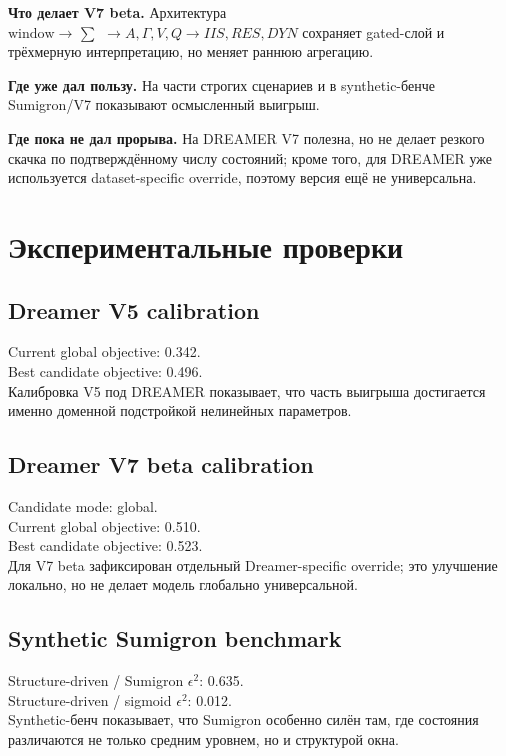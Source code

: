 \documentclass[11pt,a4paper]{article}
\newcommand{\sgop}{\mathop{\sum\!\!\!\int_{\bowtie}}}
\begin{document}
\textbf{Что делает V7 beta.} Архитектура \(\text{window} \to \sgop \to A,\Gamma,V,Q \to IIS,RES,DYN\) сохраняет gated-слой и трёхмерную интерпретацию, но меняет раннюю агрегацию.

\textbf{Где уже дал пользу.} На части строгих сценариев и в synthetic-бенче Sumigron/V7 показывают осмысленный выигрыш.

\textbf{Где пока не дал прорыва.} На DREAMER V7 полезна, но не делает резкого скачка по подтверждённому числу состояний; кроме того, для DREAMER уже используется dataset-specific override, поэтому версия ещё не универсальна.

\section{Экспериментальные проверки}
\subsection*{Dreamer V5 calibration}
Current global objective: 0.342.\\
Best candidate objective: 0.496.\\
Калибровка V5 под DREAMER показывает, что часть выигрыша достигается именно доменной подстройкой нелинейных параметров.

\subsection*{Dreamer V7 beta calibration}
Candidate mode: global.\\
Current global objective: 0.510.\\
Best candidate objective: 0.523.\\
Для V7 beta зафиксирован отдельный Dreamer-specific override; это улучшение локально, но не делает модель глобально универсальной.

\subsection*{Synthetic Sumigron benchmark}
Structure-driven / Sumigron \(\epsilon^2\): 0.635.\\
Structure-driven / sigmoid \(\epsilon^2\): 0.012.\\
Synthetic-бенч показывает, что Sumigron особенно силён там, где состояния различаются не только средним уровнем, но и структурой окна.
\end{document}
